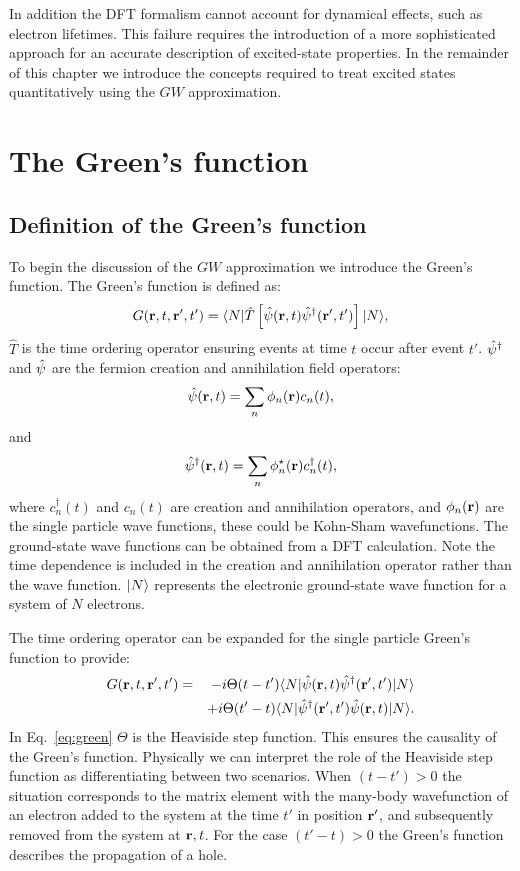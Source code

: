 In addition the DFT formalism cannot account for dynamical effects, 
such as electron lifetimes. This failure 
requires the introduction of a more sophisticated approach for an accurate description 
of excited-state properties. In the remainder of this chapter
we introduce the concepts required to treat excited states 
quantitatively using the $GW$ approximation.

\section{The Green's function}
\subsection{Definition of the Green's function}
\noindent
To begin the discussion of the $GW$ approximation we introduce the Green's function. 
The Green's function is defined as:
%
\begin{equation}
\label{eq:green0}
G({\bf r},t,{\bf r^\prime},t') = \langle N|\hat{T}\left[\hat{\psi}({\bf r},t)\hat{\psi}^{\dagger}({\bf r^\prime},t')\right]|N \rangle,
\end{equation}
%
$\hat{T}$ is the time ordering operator ensuring events at time $t$ occur
after event $t'$. $\hat{\psi}^{\dagger}$ and $\hat{\psi}$ are the fermion 
creation and annihilation field operators:
%
\begin{equation}
\hat{\psi}({\bf r},t) = \sum_{n} \phi_{n}({\bf r}) c_{n}(t),
\end{equation}
%
and 
%
\begin{equation}
\hat{\psi}^{\dagger}({\bf r},t) = \sum_{n} \phi^{\star}_{n}({\bf r}) c^{\dagger}_{n}(t),
\end{equation}
%
where $c^{\dagger}_{n}(t)$ and $c_{n}(t)$ are creation 
and annihilation operators, and $\phi_{n}({\bf r})$ are 
the single particle wave functions, these could be Kohn-Sham wavefunctions. 
The ground-state wave functions can be obtained from a DFT calculation. 
Note the time dependence is included in the creation and 
annihilation operator rather than the wave function. $|N\rangle$ represents 
the electronic ground-state wave function for a system of $N$ electrons.

The time ordering operator can be expanded for
the single particle Green's function to provide:
%
\begin{eqnarray}
\label{eq:green}
G({\bf r},t,{\bf r^\prime},t') & = & -i\Theta(t-t') \langle N|\hat{\psi}({\bf r},t)\hat{\psi}^{\dagger}({\bf r^\prime},t') |N \rangle \nonumber \\
	  	 	   &   & +i\Theta(t'-t) \langle N|\hat{\psi}^{\dagger}({\bf r^\prime},t')\hat{\psi}({\bf r},t) |N \rangle. 
\end{eqnarray}
%
In Eq.~\ref{eq:green} $\Theta$ is the Heaviside step function. This ensures the causality 
of the Green's function. Physically we can interpret the role of the Heaviside step function
as differentiating between two scenarios. When  $(t-t')>0$ the situation 
corresponds to the matrix element with the many-body wavefunction 
of an electron added to the system at the time $t'$ in position ${\bf r}'$, and subsequently removed
from the system at ${\bf r},t$. For the case $(t'-t)>0$ the Green's function describes the propagation
of a hole.

